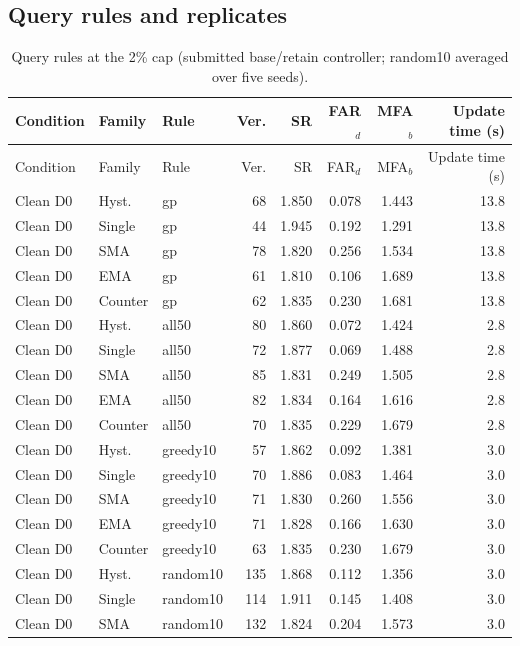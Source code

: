 \subsection{Query rules and replicates}
{\footnotesize\setlength{\tabcolsep}{4pt}
\begin{longtable}{lllrrrrr}
\caption{Query rules at the 2\% cap (submitted base/retain controller; random10 averaged over five seeds).}\label{tab:s7_selectors}\\
\toprule
Condition & Family & Rule & Ver. & SR & FAR$_d$ & MFA$_b$ & Update time (s)\\
\midrule
\endfirsthead
\toprule
Condition & Family & Rule & Ver. & SR & FAR$_d$ & MFA$_b$ & Update time (s)\\
\midrule
\endhead
\bottomrule
\endfoot
Clean D0 & Hyst. & gp & 68 & 1.850 & 0.078 & 1.443 & 13.8\\
Clean D0 & Single & gp & 44 & 1.945 & 0.192 & 1.291 & 13.8\\
Clean D0 & SMA & gp & 78 & 1.820 & 0.256 & 1.534 & 13.8\\
Clean D0 & EMA & gp & 61 & 1.810 & 0.106 & 1.689 & 13.8\\
Clean D0 & Counter & gp & 62 & 1.835 & 0.230 & 1.681 & 13.8\\
Clean D0 & Hyst. & all50 & 80 & 1.860 & 0.072 & 1.424 & 2.8\\
Clean D0 & Single & all50 & 72 & 1.877 & 0.069 & 1.488 & 2.8\\
Clean D0 & SMA & all50 & 85 & 1.831 & 0.249 & 1.505 & 2.8\\
Clean D0 & EMA & all50 & 82 & 1.834 & 0.164 & 1.616 & 2.8\\
Clean D0 & Counter & all50 & 70 & 1.835 & 0.229 & 1.679 & 2.8\\
Clean D0 & Hyst. & greedy10 & 57 & 1.862 & 0.092 & 1.381 & 3.0\\
Clean D0 & Single & greedy10 & 70 & 1.886 & 0.083 & 1.464 & 3.0\\
Clean D0 & SMA & greedy10 & 71 & 1.830 & 0.260 & 1.556 & 3.0\\
Clean D0 & EMA & greedy10 & 71 & 1.828 & 0.166 & 1.630 & 3.0\\
Clean D0 & Counter & greedy10 & 63 & 1.835 & 0.230 & 1.679 & 3.0\\
Clean D0 & Hyst. & random10 & 135 & 1.868 & 0.112 & 1.356 & 3.0\\
Clean D0 & Single & random10 & 114 & 1.911 & 0.145 & 1.408 & 3.0\\
Clean D0 & SMA & random10 & 132 & 1.824 & 0.204 & 1.573 & 3.0\\

\end{longtable}}
